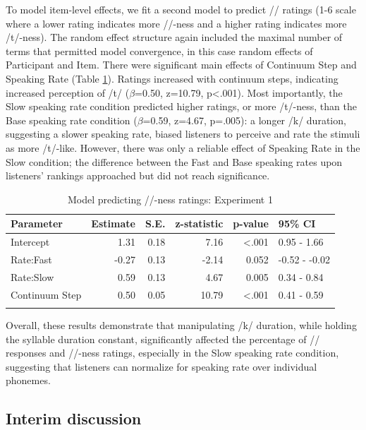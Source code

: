 To model item-level effects, we fit a second model to predict /\textesh/ ratings (1-6 scale where a lower rating indicates more /\textesh/-ness and a higher rating indicates more /t\textesh/-ness). The random effect structure again included the maximal number of terms that permitted model convergence, in this case random effects of Participant and Item. There were significant main effects of Continuum Step and Speaking Rate (Table \ref{tab:exp1-sh-rating-model-summary}). Ratings increased with continuum steps, indicating increased perception of /t\textesh/ (\(\beta\)=0.50, z=10.79, p<.001). Most importantly, the Slow speaking rate condition predicted higher ratings, or more /t\textesh/-ness, than the Base speaking rate condition (\(\beta\)=0.59, z=4.67, p=.005): a longer /k/ duration, suggesting a slower speaking rate, biased listeners to perceive and rate the stimuli as more /t\textesh/-like. However, there was only a reliable effect of Speaking Rate in the Slow condition; the difference between the Fast and Base speaking rates upon listeners' rankings approached but did not reach significance.

\begin{table}
\caption{\label{tab:exp1-sh-rating-model-summary}Model predicting /\textesh/-ness ratings: Experiment 1}
\centering
\begin{tabular}[t]{lrrrrl}
\hline\noalign{\smallskip}
Parameter & Estimate & S.E. & z-statistic & p-value & 95\% CI\\
\hline\noalign{\smallskip}
Intercept & 1.31 & 0.18 & 7.16 & <.001 & 0.95 - 1.66\\
Rate:Fast & -0.27 & 0.13 & -2.14 & 0.052 & -0.52 - -0.02\\
Rate:Slow & 0.59 & 0.13 & 4.67 & 0.005 & 0.34 - 0.84\\
Continuum Step & 0.50 & 0.05 & 10.79 & <.001 & 0.41 - 0.59\\
\hline\noalign{\smallskip}
\end{tabular}
\end{table}


Overall, these results demonstrate that manipulating /k/ duration, while holding the syllable duration constant, significantly affected the percentage of /\textesh/ responses and /\textesh/-ness ratings, especially in the Slow speaking rate condition, suggesting that listeners can normalize for speaking rate over individual phonemes.

\subsection{Interim discussion}

